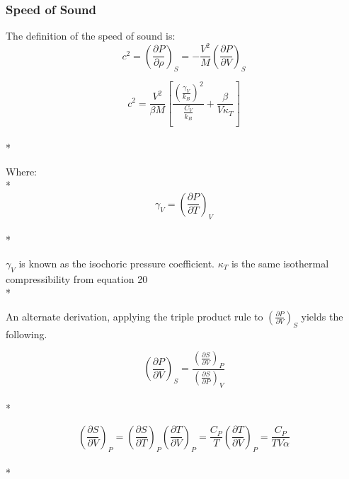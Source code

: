 \documentclass[aps,pre,twocolumn,nofootinbib,superscriptaddress,linenumbers,10pt, draft,tightenlines]{revtex4-1}
\begin{document}

\subsubsection{Speed of Sound}
The definition of the speed of sound is\cite{sos}:
\begin{equation}c^2 = \left(\frac{\partial P}{\partial \rho}\right)_{S} = -\frac{V^2}{M}\left(\frac{\partial P}{\partial V}\right)_{S}\end{equation}


\begin{equation}c^2 = \frac{V^2}{\beta M}\left[\frac{\left(\frac{\gamma_V}{k_B}\right)^2}{\frac{C_V}{k_B}} + \frac{\beta}{V \kappa_T}\right]\end{equation}\\*

Where:\\*
\begin{equation}\gamma_V = \left(\frac{\partial P}{\partial T}\right)_{V}\end{equation}\\*

 $\gamma_V$ is known as the isochoric pressure coefficient. $\kappa_T$ is the same isothermal compressibility from equation 20\\*

An alternate derivation, applying the triple product rule to $\left(\frac{\partial P}{\partial V}\right)_{S}$ yields the following.

\begin{equation}\left(\frac{\partial P}{\partial V}\right)_{S} = \frac{\left(\frac{\partial S}{\partial V}\right)_{P}}{\left(\frac{\partial S}{\partial P}\right)_{V}}\end{equation}\\*

\begin{equation}\left(\frac{\partial S}{\partial V}\right)_{P} = \left(\frac{\partial S}{\partial T}\right)_{P} \left(\frac{\partial T}{\partial V}\right)_{P} = \frac{C_P}{T} \left(\frac{\partial T}{\partial V}\right)_{P} = \frac{C_P}{T V \alpha}\end{equation}\\*
\end{document}
